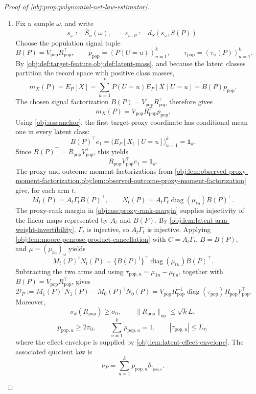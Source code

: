 \begin{proof}[Proof of \cref{obj:prop:polynomial-net-law-estimator}]
\begin{enumerate}
\item Fix a sample \(\omega\), and write
\[
s_\omega:=\widehat S_n(\omega),
\qquad
\varepsilon_{\omega,P}:=d_S(s_\omega,S(P)).
\]
Choose the population signal tuple
\[
B(P)=V_{\mathrm{pop}}R_{\mathrm{pop}}^\top,\qquad
p_{\mathrm{pop}}=(P(U=u))_{u=1}^k,\qquad
\tau_{\mathrm{pop}}=(\tau_u(P))_{u=1}^k .
\]
By \cref{obj:def:target-feature,obj:def:latent-mass}, and because the latent classes partition the record space with positive class masses,
\[
m_X(P)
=E_P[X]
=\sum_{u=1}^k P(U=u)E_P[X\mid U=u]
=B(P)p_{\mathrm{pop}}.
\]
The chosen signal factorization \(B(P)=V_{\mathrm{pop}}R_{\mathrm{pop}}^\top\) therefore gives
\[
m_X(P)=V_{\mathrm{pop}}R_{\mathrm{pop}}^\top p_{\mathrm{pop}}.
\]
Using \cref{obj:ass:anchor}, the first target-proxy coordinate has conditional mean one in every latent class:
\[
B(P)^\top e_1
=
\bigl(E_P[X_1\mid U=u]\bigr)_{u=1}^k
=\mathbf1_k.
\]
Since \(B(P)^\top=R_{\mathrm{pop}}V_{\mathrm{pop}}^\top\), this yields
\[
R_{\mathrm{pop}}V_{\mathrm{pop}}^\top e_1=\mathbf1_k.
\]
The proxy and outcome moment factorizations from
\cref{obj:lem:observed-proxy-moment-factorization,obj:lem:observed-outcome-proxy-moment-factorization} give, for each arm \(t\),
\[
M_t(P)=A_t\Gamma_tB(P)^\top,
\qquad
N_t(P)=A_t\Gamma_t\operatorname{diag}(\mu_{tu})B(P)^\top .
\]
The proxy-rank margin in \cref{obj:ass:proxy-rank-margin} supplies injectivity of the linear maps represented by \(A_t\) and \(B(P)\).  By \cref{obj:lem:latent-arm-weight-invertibility}, \(\Gamma_t\) is injective, so \(A_t\Gamma_t\) is injective.  Applying \cref{obj:lem:moore-penrose-product-cancellation} with \(C=A_t\Gamma_t\), \(B=B(P)\), and \(\mu=(\mu_{tu})_u\) yields
\[
M_t(P)^\dagger N_t(P)
=
\{B(P)^\dagger\}^\top\operatorname{diag}(\mu_{tu})B(P)^\top .
\]
Subtracting the two arms and using \(\tau_{\mathrm{pop},u}=\mu_{1u}-\mu_{0u}\), together with \(B(P)=V_{\mathrm{pop}}R_{\mathrm{pop}}^\top\), gives
\[
\mathcal D_P:=
M_1(P)^\dagger N_1(P)-M_0(P)^\dagger N_0(P)
=
V_{\mathrm{pop}}R_{\mathrm{pop}}^{-1}
\operatorname{diag}(\tau_{\mathrm{pop}})
R_{\mathrm{pop}}V_{\mathrm{pop}}^\top .
\]
Moreover,
\[
\sigma_k(R_{\mathrm{pop}})\ge\sigma_0,\qquad
\|R_{\mathrm{pop}}\|_{\mathrm{op}}\le\sqrt{k}L,
\]
\[
p_{\mathrm{pop},u}\ge2\pi_0,\qquad
\sum_{u=1}^k p_{\mathrm{pop},u}=1,\qquad
|\tau_{\mathrm{pop},u}|\le L_\tau ,
\]
where the effect envelope is supplied by \cref{obj:lem:latent-effect-envelope}.  The associated quotient law is
\[
\nu_P=\sum_{u=1}^k p_{\mathrm{pop},u}\delta_{\tau_{\mathrm{pop},u}} .
\] %


\end{enumerate}
\end{proof}
